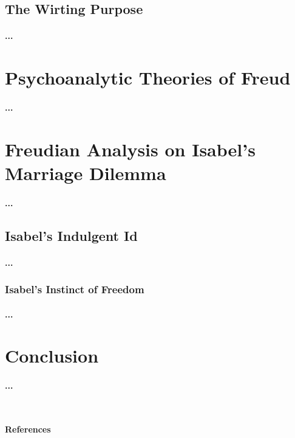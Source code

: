 \documentclass[UTF8]{ctexart}
\begin{document}
  \subsection{The Wirting Purpose}
  \paragraph{
    \hspace{4ex}...
  }
  \section{Psychoanalytic Theories of Freud}
  \paragraph{
    \hspace{4ex}...
  }
  \section{Freudian Analysis on Isabel’s Marriage Dilemma}
  \paragraph{
    \hspace{4ex}...
  }
  \subsection{Isabel’s Indulgent Id}
  \paragraph{
    \hspace{4ex}...
  }
  \subsubsection{Isabel’s Instinct of Freedom}
  \paragraph{
    \hspace{4ex}...
  }
  \section{Conclusion}
  \paragraph{
    \hspace{4ex}...
  }

  \newpage

  ~\\[1em]
  \begin{center}
    \large{\textbf{
      References
    }}\\[2em]
  \end{center}
  
  
\end{document}
